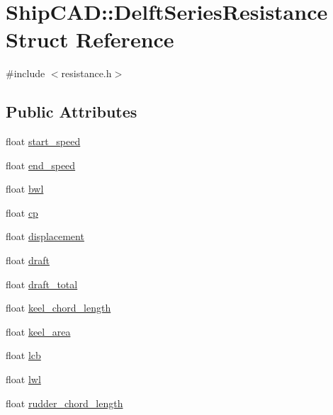 \hypertarget{structShipCAD_1_1DelftSeriesResistance}{\section{Ship\-C\-A\-D\-:\-:Delft\-Series\-Resistance Struct Reference}
\label{structShipCAD_1_1DelftSeriesResistance}
}


{\ttfamily \#include $<$resistance.\-h$>$}

\subsection*{Public Attributes}
\begin{DoxyCompactItemize}
\item 
float \hyperlink{structShipCAD_1_1DelftSeriesResistance_a040e0d678c7dbc24c29b7da618b4094d}{start\-\_\-speed}
\item 
float \hyperlink{structShipCAD_1_1DelftSeriesResistance_abd1672b905c07093735775ff455e5a98}{end\-\_\-speed}
\item 
float \hyperlink{structShipCAD_1_1DelftSeriesResistance_a160c7b99be523bcda5301231806af6b3}{bwl}
\item 
float \hyperlink{structShipCAD_1_1DelftSeriesResistance_ae489114ad6f1d03758420f77b58de519}{cp}
\item 
float \hyperlink{structShipCAD_1_1DelftSeriesResistance_a1c98fdc7b3c1b28f6f8029af2e009992}{displacement}
\item 
float \hyperlink{structShipCAD_1_1DelftSeriesResistance_a208e360c5ca0d029f9f433a7bc2cade2}{draft}
\item 
float \hyperlink{structShipCAD_1_1DelftSeriesResistance_a4db81049e448c381019f97dc630d51af}{draft\-\_\-total}
\item 
float \hyperlink{structShipCAD_1_1DelftSeriesResistance_a986244b5c6944f01dbdae5d54b895c84}{keel\-\_\-chord\-\_\-length}
\item 
float \hyperlink{structShipCAD_1_1DelftSeriesResistance_ab1bf49519c2ed054b7699898d7f5aead}{keel\-\_\-area}
\item 
float \hyperlink{structShipCAD_1_1DelftSeriesResistance_aca93b2c11316e29b2f98a3bdcdf65bc5}{lcb}
\item 
float \hyperlink{structShipCAD_1_1DelftSeriesResistance_a7232b8ea3003087a4772a650319ec8f2}{lwl}
\item 
float \hyperlink{structShipCAD_1_1DelftSeriesResistance_a5a348a92e0ba99368c50f72c81a9b0ff}{rudder\-\_\-chord\-\_\-length}

\end{DoxyCompactItemize}
